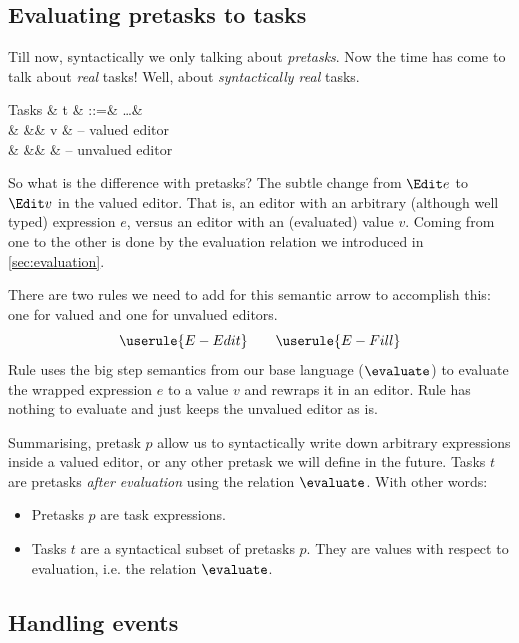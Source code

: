 \subsection{Evaluating pretasks to tasks}
\label{sec:tasks-vs-pretasks}

Till now, syntactically we only talking about \emph{pretasks}.
Now the time has come to talk about \emph{real} tasks!
Well, about \emph{syntactically real} tasks.
\begin{grammar}
  Tasks
    & t & ::=& \ldots      & \\
    &   &\mid& \Edit v     & – valued editor \\
    &   &\mid& \Fill \beta & – unvalued editor \\
\end{grammar}

So what is the difference with pretasks?
The subtle change from $\Edit e$ to $\Edit v$ in the valued editor.
That is, an editor with an arbitrary (although well typed) expression $e$,
versus an editor with an (evaluated) value $v$.
Coming from one to the other is done by the evaluation relation we introduced in \autoref{sec:evaluation}.

There are two rules we need to add for this semantic arrow to accomplish this:
one for valued and one for unvalued editors.
\begin{equation*}
  \userule{E-Edit} \qquad \userule{E-Fill}
\end{equation*}
Rule  uses the big step semantics from our base language ($\evaluate$)
to evaluate the wrapped expression $e$ to a value $v$ and rewraps it in an editor.
Rule  has nothing to evaluate and just keeps the unvalued editor as is.

Summarising, pretask $p$ allow us to syntactically write down arbitrary expressions inside a valued editor,
or any other pretask we will define in the future.
Tasks $t$ are pretasks \emph{after evaluation} using the relation $\evaluate$.
With other words:
\begin{itemize}
  \item
    Pretasks $p$ are task expressions.
  \item
    Tasks $t$ are a syntactical subset of pretasks $p$.
    They are values with respect to evaluation, i.e. the relation $\evaluate$.
\end{itemize}


\subsection{Handling events}
\label{sec:handling}

